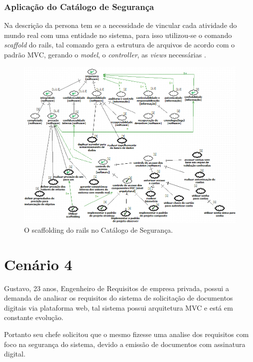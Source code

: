 \subsubsection{Aplicação do Catálogo de Segurança}

Na descrição da persona tem se a necessidade de vincular cada atividade do mundo real com uma entidade no sistema, para isso utilizou-se o comando \textit{scaffold} do rails, tal comando gera a estrutura de arquivos de acordo com o padrão MVC, gerando o \textit{model}, o \textit{controller}, as \textit{views} necessárias \cite{railscommunity}. 

\begin{figure}[h!]
	\centering
	\includegraphics[keepaspectratio=true,scale=0.7]{figuras/catalogoPersona3.PNG}
	\caption{O scaffolding do rails no Catálogo de Segurança.}
	\label{catalogoPersona3}
\end{figure}


\section{Cenário 4}
\label{subsec:persona4}


Gustavo, 23 anos, Engenheiro de Requisitos de empresa privada, possui a demanda de analisar os requisitos do sistema de solicitação de documentos digitais via plataforma web, tal sistema possui arquitetura MVC e está em constante evolução. 

Portanto seu chefe solicitou que o mesmo fizesse uma analise dos requisitos com foco na segurança do sistema, devido a emissão de documentos com assinatura digital. 

